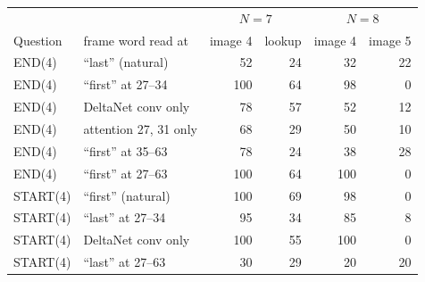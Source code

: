 \begin{tabular}{llrrrr}
\toprule
 & & \multicolumn{2}{c}{$N=7$} & \multicolumn{2}{c}{$N=8$} \\
Question & frame word read at & image 4 & lookup & image 4 & image 5 \\
\midrule
END(4) & ``last'' (natural) & 52 & 24 & 32 & 22 \\
END(4) & ``first'' at 27--34 & 100 & 64 & 98 & 0 \\
END(4) & \quad DeltaNet conv only & 78 & 57 & 52 & 12 \\
END(4) & \quad attention 27, 31 only & 68 & 29 & 50 & 10 \\
END(4) & ``first'' at 35--63 & 78 & 24 & 38 & 28 \\
END(4) & ``first'' at 27--63 & 100 & 64 & 100 & 0 \\
START(4) & ``first'' (natural) & 100 & 69 & 98 & 0 \\
START(4) & ``last'' at 27--34 & 95 & 34 & 85 & 8 \\
START(4) & \quad DeltaNet conv only & 100 & 55 & 100 & 0 \\
START(4) & ``last'' at 27--63 & 30 & 29 & 20 & 20 \\
\bottomrule
\end{tabular}

